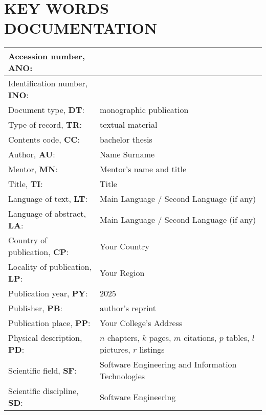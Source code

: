 {
    \newpage
    \section*{\MakeUppercase{Key words documentation}}
    \small
    \begin{longtable}{| p{} | p{} |}
        \hline
        Accession number, \textbf{ANO}:                 & \\ \hline
        Identification number, \textbf{INO}:            & \\ \hline
        Document type, \textbf{DT}:                     & monographic publication \\ \hline
        Type of record, \textbf{TR}:                    & textual material \\ \hline
        Contents code, \textbf{CC}:                     & bachelor thesis \\ \hline
        Author, \textbf{AU}:                            & Name Surname \\ \hline
        Mentor, \textbf{MN}:                            & Mentor's name and title \\ \hline
        Title, \textbf{TI}:                             & Title \\ \hline
        Language of text, \textbf{LT}:                  & Main Language / Second Language (if any) \\ \hline
        Language of abstract, \textbf{LA}:              & Main Language / Second Language (if any) \\ \hline
        Country of publication, \textbf{CP}:            & Your Country \\ \hline
        Locality of publication, \textbf{LP}:           & Your Region \\ \hline
        Publication year, \textbf{PY}:                  & 2025 \\ \hline
        Publisher, \textbf{PB}:                         & author's reprint \\ \hline
        Publication place, \textbf{PP}:                 & Your College's Address \\ \hline
        Physical description, \textbf{PD}:              & $n$ chapters, $k$ pages, $m$ citations, $p$ tables, $l$ pictures, $r$ listings \\ \hline
        Scientific field, \textbf{SF}:                  & Software Engineering and Information Technologies  \\ \hline
        Scientific discipline, \textbf{SD}:             & Software Engineering \\ \hline

\end{longtable}}
